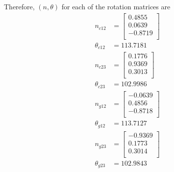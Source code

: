 \documentclass[]{article}
\begin{document}
\indent Therefore, $(n, \theta)$ for each of the rotation matrices are
\begin{align*}
n_{c12} &=
\begin{bmatrix}
0.4855\\
0.0639\\
-0.8719\\
\end{bmatrix}\\
\theta_{c12} &= 113.7181\\
n_{c23} &=
\begin{bmatrix}
0.1776\\
0.9369\\
0.3013\\
\end{bmatrix}\\
\theta_{c23} &= 102.9986\\
n_{g12} &=
\begin{bmatrix}
-0.0639\\
0.4856\\
-0.8718\\
\end{bmatrix}\\
\theta_{g12} &= 113.7127\\
n_{g23} &=
\begin{bmatrix}
-0.9369\\
0.1773\\
0.3014\\
\end{bmatrix}\\
\theta_{g23} &= 102.9843\\
\end{align*}

\newpage
\end{document}
